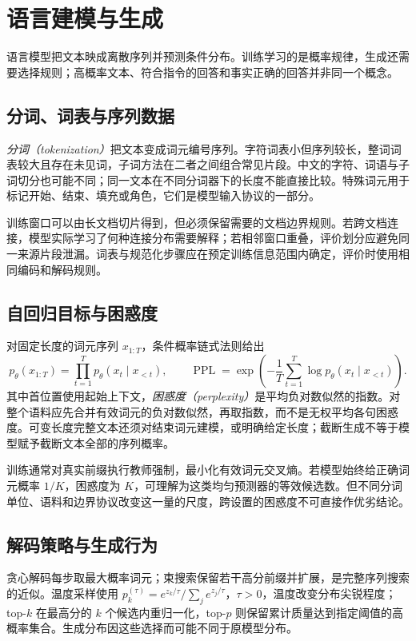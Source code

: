 \setcounter{chapter}{16} %
\chapter{语言建模与生成}
\label{chap:dl-language}
语言模型把文本映成离散序列并预测条件分布。训练学习的是概率规律，生成还需要选择规则；高概率文本、符合指令的回答和事实正确的回答并非同一个概念。

\section{分词、词表与序列数据}
\emph{分词（tokenization）}把文本变成词元编号序列。字符词表小但序列较长，整词词表较大且存在未见词，子词方法在二者之间组合常见片段。中文的字符、词语与子词切分也可能不同；同一文本在不同分词器下的长度不能直接比较。特殊词元用于标记开始、结束、填充或角色，它们是模型输入协议的一部分。

训练窗口可以由长文档切片得到，但必须保留需要的文档边界规则。若跨文档连接，模型实际学习了何种连接分布需要解释；若相邻窗口重叠，评价划分应避免同一来源片段泄漏。词表与规范化步骤应在预定训练信息范围内确定，评价时使用相同编码和解码规则。

\section{自回归目标与困惑度}
对固定长度的词元序列 $x_{1:T}$，条件概率链式法则给出
\begin{equation}
 p_\theta(x_{1:T})=\prod_{t=1}^Tp_\theta(x_t\mid x_{<t}),\qquad
 \operatorname{PPL}=\exp\!\left(-\frac1T\sum_{t=1}^T\log p_\theta(x_t\mid x_{<t})\right).
\label{eq:dl-language-probability}
\end{equation}
其中首位置使用起始上下文，\emph{困惑度（perplexity）}是平均负对数似然的指数。对整个语料应先合并有效词元的负对数似然，再取指数，而不是无权平均各句困惑度。可变长度完整文本还须对结束词元建模，或明确给定长度；截断生成不等于模型赋予截断文本全部的序列概率。

训练通常对真实前缀执行教师强制，最小化有效词元交叉熵。若模型始终给正确词元概率 $1/K$，困惑度为 $K$，可理解为这类均匀预测器的等效候选数。但不同分词单位、语料和边界协议改变这一量的尺度，跨设置的困惑度不可直接作优劣结论。

\section{解码策略与生成行为}
贪心解码每步取最大概率词元；束搜索保留若干高分前缀并扩展，是完整序列搜索的近似。温度采样使用 $p_k^{(\tau)}=e^{z_k/\tau}/\sum_je^{z_j/\tau}$，$\tau>0$，温度改变分布尖锐程度；top-$k$ 在最高分的 $k$ 个候选内重归一化，top-$p$ 则保留累计质量达到指定阈值的高概率集合。生成分布因这些选择而可能不同于原模型分布。

